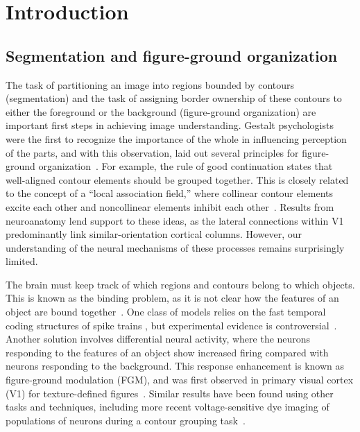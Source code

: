 \chapter{Introduction}
\label{sec:intro}


\section{Segmentation and figure-ground organization}

The task of partitioning an image into regions bounded by contours (segmentation) and the task of assigning border ownership of these contours to either the foreground or the background (figure-ground organization) are important first steps in achieving image understanding. Gestalt psychologists were the first to recognize the importance of the whole in influencing perception of the parts, and with this observation, laid out several principles for figure-ground organization~\citep{Koffka35, Wertheimer23}. For example, the rule of good continuation states that well-aligned contour elements should be grouped together. This is closely related to the concept of a ``local association field,'' where collinear contour elements excite each other and noncollinear elements inhibit each other~\citep{Ullman92, Field_etal93}. Results from neuroanatomy lend support to these ideas, as the lateral connections within V1 predominantly link similar-orientation cortical columns. However, our understanding of the neural mechanisms of these processes remains surprisingly limited.
 
The brain must keep track of which regions and contours belong to which objects. This is known as the binding problem, as it is not clear how the features of an object are bound together~\citep{Treisman96b}. One class of models relies on the fast temporal coding structures of spike trains \citep{Singer99b}, but experimental evidence is controversial~\citep{Thiele_Stoner03,Roelfsema_etal04,Dong_etal08a}. Another solution involves differential neural activity, where the neurons responding to the features of an object show increased firing compared with neurons responding to the background. This response enhancement is known as figure-ground modulation (FGM), and was first observed in primary visual cortex (V1) for texture-defined figures~\citep{Lamme95}. Similar results have been found using other tasks and techniques, including more recent voltage-sensitive dye imaging of populations of neurons during a contour grouping task~\citep{Gilad_etal13}.


